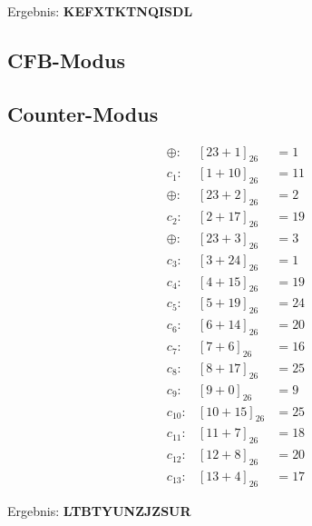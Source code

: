 \documentclass{../crypto}
\begin{document}
Ergebnis: \textbf{KEFXTKTNQISDL}

\subsection{CFB-Modus}

\subsection{Counter-Modus}
\begin{align*}
    \oplus: & \left[23+1\right]_{26} &= 1 \\
    c_{1}: & \left[1+10\right]_{26} &= 11\\
    \oplus: & \left[23+2\right]_{26} &= 2\\
    c_{2}: & \left[2+17\right]_{26} &= 19\\
    \oplus: & \left[23+3\right]_{26} &= 3\\
    c_{3}: & \left[3+24\right]_{26} &= 1\\
    c_{4}: & \left[4+15\right]_{26} &= 19\\
    c_{5}: & \left[5+19\right]_{26} &= 24\\
    c_{6}: & \left[6+14\right]_{26} &= 20\\
    c_{7}: & \left[7+6\right]_{26} &= 16\\
    c_{8}: & \left[8+17\right]_{26} &= 25\\
    c_{9}: & \left[9+0\right]_{26} &= 9\\
    c_{10}: & \left[10+15\right]_{26} &= 25\\
    c_{11}: & \left[11+7\right]_{26} &= 18\\
    c_{12}: & \left[12+8\right]_{26} &= 20\\
    c_{13}: & \left[13+4\right]_{26} &= 17
\end{align*}

Ergebnis: \textbf{LTBTYUNZJZSUR}
\end{document}

